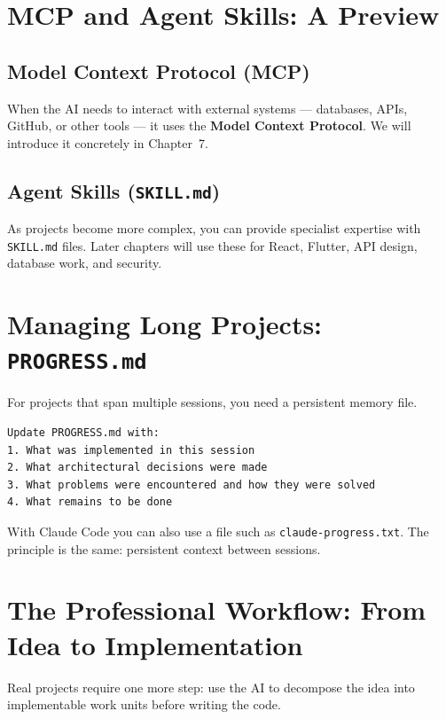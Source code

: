 \section{MCP and Agent Skills: A Preview}

\subsection{Model Context Protocol (MCP)}
When the AI needs to interact with external systems --- databases, APIs, GitHub, or other tools --- it uses the \textbf{Model Context Protocol}. We will introduce it concretely in Chapter~7.

\subsection{Agent Skills (\texttt{SKILL.md})}
As projects become more complex, you can provide specialist expertise with \texttt{SKILL.md} files. Later chapters will use these for React, Flutter, API design, database work, and security.

\section{Managing Long Projects: \texttt{PROGRESS.md}}

For projects that span multiple sessions, you need a persistent memory file.

\begin{lstlisting}[language={}]
Update PROGRESS.md with:
1. What was implemented in this session
2. What architectural decisions were made
3. What problems were encountered and how they were solved
4. What remains to be done
\end{lstlisting}

\begin{notebox}
With Claude Code you can also use a file such as \texttt{claude-progress.txt}. The principle is the same: persistent context between sessions.
\end{notebox}

\section{The Professional Workflow: From Idea to Implementation}

Real projects require one more step: use the AI to decompose the idea into implementable work units before writing the code.

